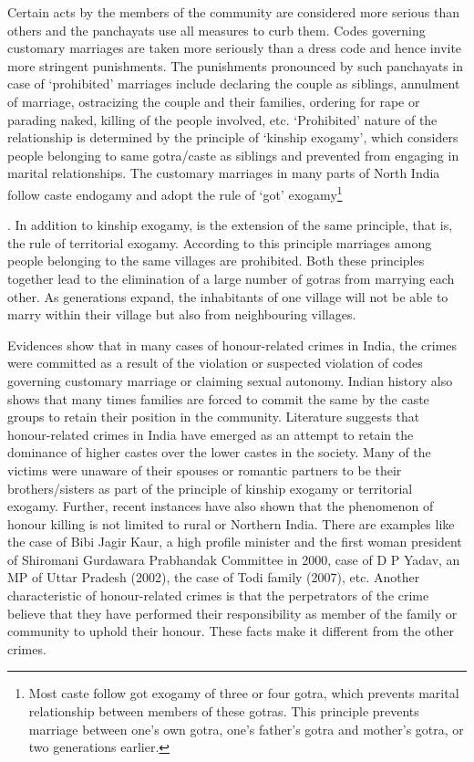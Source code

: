 \begin{multicols}{2}
\noi
Certain acts by the members of the community are considered more serious than others
and the panchayats use all measures to curb them. Codes governing customary
marriages are taken more seriously than a dress code and hence invite more stringent
punishments. The punishments pronounced by such panchayats in case of ‘prohibited’
marriages include declaring the couple as siblings, annulment of marriage, ostracizing
the couple and their families, ordering for rape or parading naked, killing of the people
involved, etc. ‘Prohibited’ nature of the relationship is determined by the principle of
‘kinship exogamy’, which considers people belonging to same gotra/caste as siblings
and prevented from engaging in marital relationships. The customary marriages in
many parts of North India follow caste endogamy and adopt the rule of ‘got’ exogamy\footnote{Most caste follow got exogamy of three or four gotra, which prevents marital relationship between
members of these gotras. This principle prevents marriage between one’s own gotra, one’s father’s gotra
and mother’s gotra, or two generations earlier.}

\noi.
In addition to kinship exogamy, is the extension of the same principle, that is, the rule
of territorial exogamy. According to this principle marriages among people belonging
to the same villages are prohibited. Both these principles together lead to the
elimination of a large number of gotras from marrying each other. As generations
expand, the inhabitants of one village will not be able to marry within their village but
also from neighbouring villages.

\noi
Evidences show that in many cases of honour-related crimes in India, the crimes were
committed as a result of the violation or suspected violation of codes governing
customary marriage or claiming sexual autonomy. Indian history also shows that many
times families are forced to commit the same by the caste groups to retain their position
in the community. Literature suggests that honour-related crimes in India have emerged
as an attempt to retain the dominance of higher castes over the lower castes in the society. Many of the victims were unaware of their spouses or romantic partners to be
their brothers/sisters as part of the principle of kinship exogamy or territorial exogamy.
Further, recent instances have also shown that the phenomenon of honour killing is not
limited to rural or Northern India. There are examples like the case of Bibi Jagir Kaur,
a high profile minister and the first woman president of Shiromani Gurdawara
Prabhandak Committee in 2000, case of D P Yadav, an MP of Uttar Pradesh (2002),
the case of Todi family (2007), etc. Another characteristic of honour-related crimes is
that the perpetrators of the crime believe that they have performed their responsibility
as member of the family or community to uphold their honour. These facts make it
different from the other crimes. 


\end{multicols}
